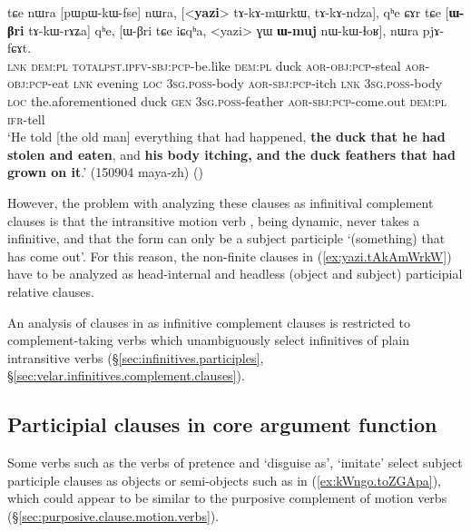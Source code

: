 \begin{exe}
\ex \label{ex:yazi.tAkAmWrkW}
\gll tɕe nɯra [pɯ\redp{}pɯ-kɯ-fse] nɯra, [<\textbf{yazi}> tɤ-kɤ-mɯrkɯ, tɤ-kɤ-ndza], qʰe ɕɤr tɕe [\textbf{ɯ-βri} tɤ-kɯ-rɤʑa] qʰe, [ɯ-βri tɕe iɕqʰa, <yazi> ɣɯ \textbf{ɯ-muj} nɯ-kɯ-ɬoʁ], nɯra pjɤ-fɕɤt. \\
\textsc{lnk} \textsc{dem}:\textsc{pl} \textsc{total}\redp{}\textsc{pst}.\textsc{ipfv}-\textsc{sbj}:\textsc{pcp}-be.like \textsc{dem}:\textsc{pl}  duck \textsc{aor}-\textsc{obj}:\textsc{pcp}-steal \textsc{aor}-\textsc{obj}:\textsc{pcp}-eat \textsc{lnk} evening \textsc{loc} \textsc{3sg}.\textsc{poss}-body \textsc{aor}-\textsc{sbj}:\textsc{pcp}-itch \textsc{lnk}   \textsc{3sg}.\textsc{poss}-body \textsc{loc} the.aforementioned duck \textsc{gen} \textsc{3sg}.\textsc{poss}-feather \textsc{aor}-\textsc{sbj}:\textsc{pcp}-come.out \textsc{dem}:\textsc{pl} \textsc{ifr}-tell \\
\glt `He told [the old man] everything that had happened, \textbf{the duck that he had stolen and eaten}, and \textbf{his body itching, and the duck feathers that had grown on it}.' (150904 maya-zh)
()
 \end{exe}

However, the problem with analyzing these clauses as infinitival complement clauses is that the intransitive  motion verb , being dynamic, never takes a  infinitive, and that the form  can only be a subject participle `(something) that has come out'. For this reason, the non-finite clauses in (\ref{ex:yazi.tAkAmWrkW}) have to be analyzed as head-internal and headless (object and subject) participial relative clauses.

An analysis of clauses in  as infinitive complement clauses is restricted to complement-taking verbs which unambiguously select  infinitives of plain intransitive verbs (§\ref{sec:infinitives.participles}, §\ref{sec:velar.infinitives.complement.clauses}). 
 
\subsection{Participial clauses in core argument function} \label{sec:relative.pretence}
Some verbs such as the verbs of pretence  and  `disguise as', `imitate' select subject participle clauses as objects or semi-objects such as  in (\ref{ex:kWngo.toZGApa}), which could appear to be similar to the purposive complement of motion verbs (§\ref{sec:purposive.clause.motion.verbs}).

